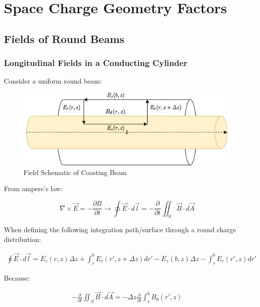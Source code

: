 \appendix

\chapter{Space Charge Geometry Factors}

\section{Fields of Round Beams}

\subsection{Longitudinal Fields in a Conducting Cylinder}

Consider a uniform round beam:

\begin{figure}
    \centering
    \includegraphics{figs/amperian_surface.png}
    \caption{Field Schematic of Coasting Beam}

\end{figure}

From ampere's law:

$$\nabla \times \vec{E} = -\frac{\partial B}{\partial t} \to \oint \vec{E}\cdot d\vec{l} = -\frac{\partial}{\partial t}\iint_S\vec{B}\cdot d\vec{A}$$

When defining the following integration path/surface through a round charge distribution:

$$\begin{aligned}
        \oint \vec{E}\cdot d\vec{l} = E_z(r,z)\Delta z + \int_r^bE_r(r', z+\Delta z)dr'-E_z(b, z)\Delta z -\int_r^bE_r(r', z)dr'
    \end{aligned}$$

Because:

$$\begin{aligned}
        -\frac{\partial}{\partial t}\iint_S\vec{B}\cdot d\vec{A} = -\Delta z \frac{\partial}{\partial t}\int_r^bB_{\theta}(r', z)
    \end{aligned}$$


